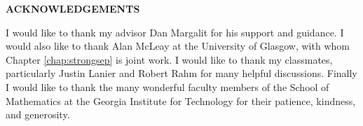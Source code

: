 \clearpage
\begin{centering}
\textbf{ACKNOWLEDGEMENTS}\\
\vspace{\baselineskip}
\end{centering}

I would like to thank my advisor Dan Margalit for his support and guidance.
I would also like to thank Alan McLeay at the University of Glasgow,
with whom Chapter \ref{chap:strongsep}
is joint work.
I would like to thank my classmates, particularly Justin Lanier and Robert Rahm for many helpful discussions.
Finally I would like to thank the many wonderful faculty members of the School of Mathematics at the Georgia Institute for Technology for their patience, kindness, and generosity.

\clearpage

